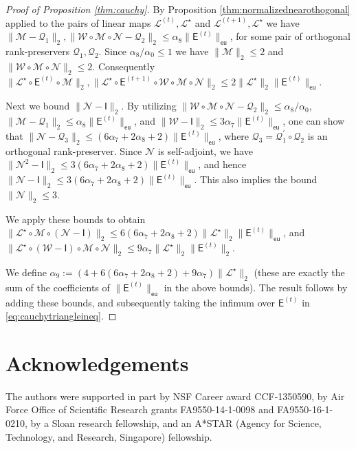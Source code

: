 \documentclass[11pt,letterpaper]{article}
\newcommand{\sfe}{\mathsf{E}}
\newcommand{\sfi}{\mathsf{I}}
\newcommand{\eu}{\mathsf{eu}}
\begin{document}
\begin{proof}[Proof of Proposition \ref{thm:cauchy}]
	By Proposition \ref{thm:normalizednearothogonal} applied to the pairs of linear maps $\mathcal{L}^{(t)},\mathcal{L}^{\star}$ and $\mathcal{L}^{(t+1)},\mathcal{L}^{\star}$ we have $\|\mathcal{M} - \mathcal{Q}_1 \|_{2}, \|\mathcal{W}  \circ \mathcal{M} \circ \mathcal{N} - \mathcal{Q}_2\|_{2}\leq \alpha_8 \|\sfe^{(t)}\|_{\eu}$, for some pair of orthogonal rank-preservers $\mathcal{Q}_1, \mathcal{Q}_2$.  Since $\alpha_8/\alpha_0\leq 1$ we have $\|\mathcal{M}\|_{2} \leq 2$ and $\|\mathcal{W}  \circ \mathcal{M} \circ \mathcal{N}\|_{2} \leq 2$.  Consequently $\| \mathcal{L}^{\star} \circ \sfe^{(t)} \circ \mathcal{M} \|_2, \| \mathcal{L}^{\star} \circ \sfe^{(t+1)} \circ \mathcal{W} \circ \mathcal{M} \circ \mathcal{N} \|_2 \leq 2\|\mathcal{L}^{\star}\|_2\|\sfe^{(t)}\|_{\eu}$.
	
	Next we bound $\|\mathcal{N} - \sfi\|_2$.  By utilizing $\|\mathcal{W}  \circ \mathcal{M} \circ \mathcal{N} - \mathcal{Q}_2\|_{2} \leq \alpha_8 / \alpha_0$, $\|\mathcal{M} - \mathcal{Q}_1 \|_{2} \leq \alpha_8 \|\sfe^{(t)}\|_{\eu}$, and $\|\mathcal{W} - \sfi\|_2 \leq 3 \alpha_7\|\sfe^{(t)}\|_{\eu}$, one can show that $\|\mathcal{N}-\mathcal{Q}_3\|_2 \leq (6 \alpha_7 + 2\alpha_8 + 2) \|\sfe^{(t)}\|_{\eu}$, where $\mathcal{Q}_3 = \mathcal{Q}_1^{\prime} \circ \mathcal{Q}_2$ is an orthogonal rank-preserver.  Since $\mathcal{N}$ is self-adjoint, we have $\|\mathcal{N}^2-\sfi\|_2 \leq 3 (6 \alpha_7 + 2\alpha_8 + 2) \|\sfe^{(t)}\|_{\eu}$, and hence $\|\mathcal{N}-\sfi\|_2 \leq 3(6 \alpha_7 + 2\alpha_8 + 2)\|\sfe^{(t)}\|_{\eu}$.  This also implies the bound $\|\mathcal{N}\|_2 \leq 3$.
	
	We apply these bounds to obtain $\| \mathcal{L}^{\star}  \circ \mathcal{M} \circ (\mathcal{N} - \sfi) \|_2 \leq 6 (6 \alpha_7 + 2\alpha_8 + 2) \|\mathcal{L}^{\star}\|_2 \|\sfe^{(t)}\|_{\eu}$, and $\| \mathcal{L}^{\star} \circ (\mathcal{W} - \sfi) \circ \mathcal{M} \circ \mathcal{N} \|_2 \leq 9 \alpha_7 \|\mathcal{L}^{\star}\|_2 \|\sfe^{(t)}\|_2$.
	
	We define $\alpha_9 := (4 + 6 (6 \alpha_7 + 2\alpha_8 + 2) + 9 \alpha_7 )\|\mathcal{L}^{\star}\|_2$ (these are exactly the sum of the coefficients of $\|\sfe^{(t)}\|_{\eu}$ in the above bounds).  The result follows by adding these bounds, and subsequently taking the infimum over $\sfe^{(t)}$ in \eqref{eq:cauchytriangleineq}.
\end{proof}


\section*{Acknowledgements}

The authors were supported in part by NSF Career award CCF-1350590, by Air Force Office of Scientific Research grants FA9550-14-1-0098 and FA9550-16-1-0210, by a Sloan research fellowship, and an A*STAR (Agency for Science, Technology, and Research, Singapore) fellowship.


\end{document}
